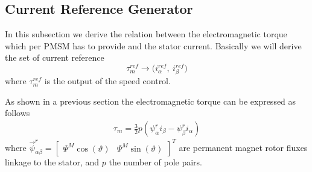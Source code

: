 \documentclass[11pt,a4paper,oneside]{book}
\numberwithin{equation}{section}
\theoremstyle{it}
\theoremstyle{definition}
\begin{document}
\subsection{Current Reference Generator}
In this subsection we derive the relation between the electromagnetic torque which per PMSM has to provide and the stator current. Basically we will derive the set of current reference
\begin{equation}\label{pmsm_problem_1_eq_17}
	\tau_m^{ref}\rightarrow \big(i_\alpha^{ref},\ i_\beta^{ref}\big)
\end{equation}
where $\tau_m^{ref}$ is the output of the speed control.

As shown in a previous section the electromagnetic torque can be expressed as 
follows
\begin{equation}\label{pmsm_problem_1_eq_18}
	\begin{aligned}
		\tau_m = \frac{3}{2}p\left( 
		\psi^r_{\alpha}i_{\beta}-\psi^r_{\beta}i_{\alpha}\right) 
	\end{aligned} 
\end{equation}
where $\vec{\psi}^r_{\alpha\beta} = \begin{bmatrix} \Psi^M\cos(\vartheta) &  
	\Psi^M\sin(\vartheta)\end{bmatrix}^T$ are permanent magnet rotor fluxes linkage to the stator, and $p$ the number of pole pairs.
\end{document}
